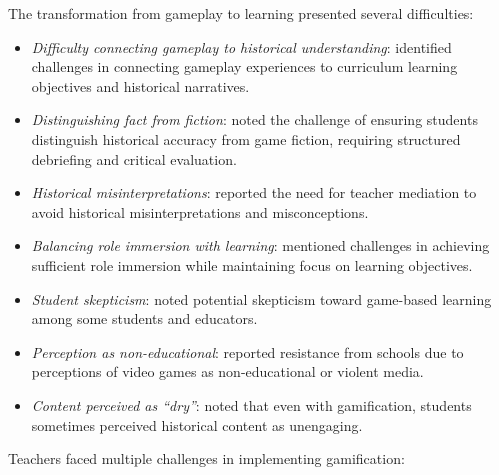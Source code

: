 \documentclass[a4paper,fleqn]{cas-sc}
\begin{document}

The transformation from gameplay to learning presented several difficulties:

\begin{itemize}[noitemsep]
 \item \textit{Difficulty connecting gameplay to historical understanding}: \citet{65Razak201139} identified challenges in connecting gameplay experiences to curriculum learning objectives and historical narratives.
 
 \item \textit{Distinguishing fact from fiction}: \citet{71lynch2015pedagogical} noted the challenge of ensuring students distinguish historical accuracy from game fiction, requiring structured debriefing and critical evaluation.
 
 \item \textit{Historical misinterpretations}: \citet{72hutauruk2020utilization} reported the need for teacher mediation to avoid historical misinterpretations and misconceptions.
 
 \item \textit{Balancing role immersion with learning}: \citet{64Hsu201324} mentioned challenges in achieving sufficient role immersion while maintaining focus on learning objectives.
 
 \item \textit{Student skepticism}: \citet{2Mahamarowi2023133} noted potential skepticism toward game-based learning among some students and educators.
 
 \item \textit{Perception as non-educational}: \citet{12Gilbert2019108} reported resistance from schools due to perceptions of video games as non-educational or violent media.
 
 \item \textit{Content perceived as ``dry''}: \citet{21Ghulamani2017} noted that even with gamification, students sometimes perceived historical content as unengaging.
\end{itemize}


Teachers faced multiple challenges in implementing gamification:
\end{document}
